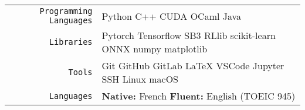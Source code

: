 \documentclass[
    10pt,
    A4,
    english,
    draft = false,
    twoside = false,
]{article}
\begin{document}
	\tab \begin{tabular}{r p{}}
		\texttt{\large Programming Languages} & Python \cvContactSep
		C++ \cvContactSep CUDA \cvContactSep OCaml \cvContactSep Java\\
		\texttt{\large Libraries} & Pytorch \cvContactSep Tensorflow
		\cvContactSep SB3 \cvContactSep RLlib \cvContactSep
		scikit-learn \cvContactSep ONNX \cvContactSep numpy \cvContactSep
		matplotlib\\
		\texttt{\large Tools} & Git \cvContactSep GitHub \cvContactSep GitLab \cvContactSep \LaTeX \cvContactSep
		VSCode \cvContactSep Jupyter \cvContactSep SSH \cvContactSep Linux
		\cvContactSep macOS\\
		\texttt{\large Languages} & \textbf{Native:} French \cvContactSep \textbf{Fluent:} English (TOEIC 945)\\
	\end{tabular}\\~\\
	
	
	
	 
	
\end{document}
